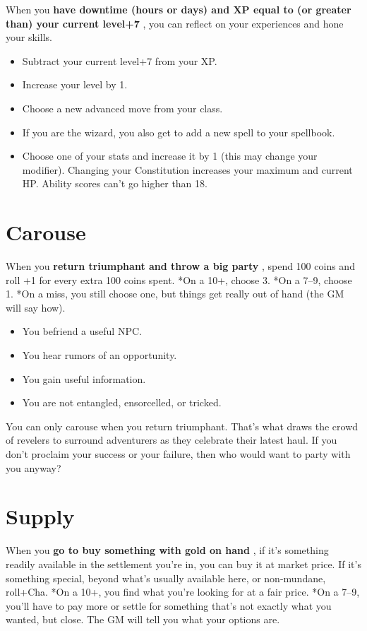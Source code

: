  When you \textbf{have downtime (hours or days) and XP equal to (or greater than) your current level+7}
, you can reflect on your experiences and hone your skills.
\begin{itemize}
\item Subtract your current level+7 from your XP.
\item Increase your level by 1.
\item Choose a new advanced move from your class.
\item If you are the wizard, you also get to add a new spell to your spellbook.
\item Choose one of your stats and increase it by 1 (this may change your modifier). Changing your Constitution increases your maximum and current HP. Ability scores can't go higher than 18.

\end{itemize}
\section{Carouse}


 When you \textbf{return triumphant and throw a big party}
, spend 100 coins and roll +1 for every extra 100 coins spent. *On a 10+, choose 3. *On a 7--9, choose 1. *On a miss, you still choose one, but things get really out of hand (the GM will say how).
\begin{itemize}
\item You befriend a useful NPC.
\item You hear rumors of an opportunity.
\item You gain useful information.
\item You are not entangled, ensorcelled, or tricked.

\end{itemize}


 You can only carouse when you return triumphant. That's what draws the crowd of revelers to surround adventurers as they celebrate their latest haul. If you don't proclaim your success or your failure, then who would want to party with you anyway?
\section{Supply}


 When you \textbf{go to buy something with gold on hand}
, if it's something readily available in the settlement you're in, you can buy it at market price. If it's something special, beyond what's usually available here, or non-mundane, roll+Cha. *On a 10+, you find what you're looking for at a fair price. *On a 7--9, you'll have to pay more or settle for something that's not exactly what you wanted, but close. The GM will tell you what your options are.
